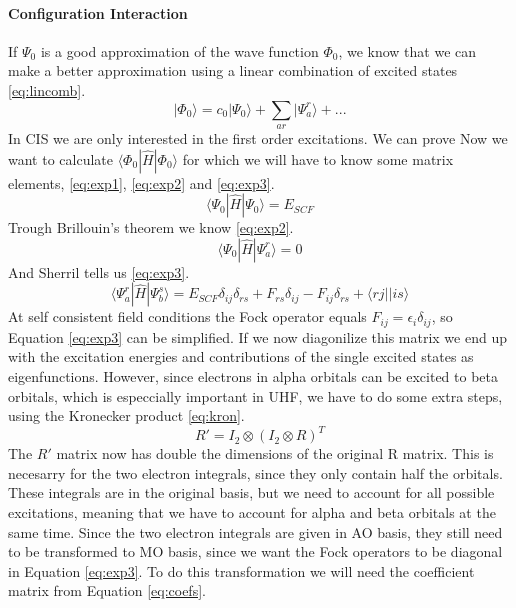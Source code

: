 \paragraph{Configuration Interaction}
If $\Psi_0$ is a good approximation of the wave function $\Phi_0$, we know that we can make a better approximation using a linear combination of excited states \eqref{eq:lincomb}.
\begin{equation}\label{eq:lincomb}
    |\Phi_0\rangle = c_0|\Psi_0\rangle + \sum_{ar}|\Psi_a^r\rangle + ...
\end{equation}
In CIS we are only interested in the first order excitations. We can prove Now we want to calculate $\langle\Phi_0|\hat{H}|\Phi_0\rangle$ for which we will have to know some matrix elements, \eqref{eq:exp1}, \eqref{eq:exp2} and \eqref{eq:exp3}.
\begin{equation}\label{eq:exp1}
    \langle\Psi_0|\hat{H}|\Psi_0\rangle = E_{SCF}
\end{equation}
Trough Brillouin's theorem we know \eqref{eq:exp2}.
\begin{equation}\label{eq:exp2}
    \langle\Psi_0|\hat{H}|\Psi_a^r\rangle = 0
\end{equation}
And Sherril tells us \eqref{eq:exp3}.
\begin{equation}\label{eq:exp3}
    \langle\Psi_a^r|\hat{H}|\Psi_b^s\rangle = E_{SCF}\delta_{ij}\delta_{rs} + F_{rs}\delta_{ij} - F_{ij}\delta_{rs} + \langle rj||is\rangle
\end{equation}
At self consistent field conditions the Fock operator equals $F_{ij} = \epsilon_i\delta_{ij}$, so Equation \eqref{eq:exp3} can be simplified. If we now diagonilize this matrix we end up with the excitation energies and contributions of the single excited states as eigenfunctions. However, since electrons in alpha orbitals can be excited to beta orbitals, which is especcially important in UHF, we have to do some extra steps, using the Kronecker product \eqref{eq:kron}.
\begin{equation}\label{eq:kron}
    R' = I_2 \otimes (I_2 \otimes R)^T
\end{equation}
The $R'$ matrix now has double the dimensions of the original R matrix. This is necesarry for the two electron integrals, since they only contain half the orbitals. These integrals are in the original basis, but we need to account for all possible excitations, meaning that we have to account for alpha and beta orbitals at the same time. Since the two electron integrals are given in AO basis, they still need to be transformed to MO basis, since we want the Fock operators to be diagonal in Equation \eqref{eq:exp3}. To do this transformation we will need the coefficient matrix from Equation \eqref{eq:coefs}.
